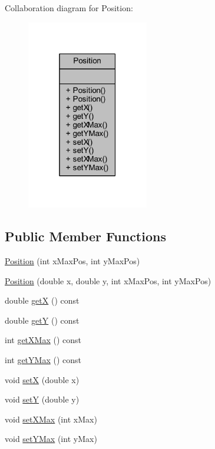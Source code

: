 Collaboration diagram for Position\+:
\nopagebreak
\begin{figure}[H]
\begin{center}
\leavevmode
\includegraphics[width=151pt]{class_position__coll__graph}
\end{center}
\end{figure}
\subsection*{Public Member Functions}
\begin{DoxyCompactItemize}
\item 
\mbox{\hyperlink{class_position_a64f68cd96fa0eedccbb760143b82442a}{Position}} (int x\+Max\+Pos, int y\+Max\+Pos)
\item 
\mbox{\hyperlink{class_position_ace954f29b47b5324517ea8ed2487c949}{Position}} (double x, double y, int x\+Max\+Pos, int y\+Max\+Pos)
\item 
double \mbox{\hyperlink{class_position_a10a2a09ec64310f42138f98238ec5fbd}{getX}} () const
\item 
double \mbox{\hyperlink{class_position_a83ae4a9db1a4f29e5a43e5592b65f095}{getY}} () const
\item 
int \mbox{\hyperlink{class_position_abc0b7856e25fab037f1dbfb543ec96cf}{get\+X\+Max}} () const
\item 
int \mbox{\hyperlink{class_position_a6796150fb51e6d8760a5d025b09d1ca5}{get\+Y\+Max}} () const
\item 
void \mbox{\hyperlink{class_position_af12bdfae6a9ccecfc31d968de3613a1d}{setX}} (double x)
\item 
void \mbox{\hyperlink{class_position_a5fbae78d4986da56edad357a82e1e376}{setY}} (double y)
\item 
void \mbox{\hyperlink{class_position_acb2c50493422d1a6faceb3ed7e2a8caf}{set\+X\+Max}} (int x\+Max)
\item 
void \mbox{\hyperlink{class_position_a715321d96c4195ddb3381b52a6cf547c}{set\+Y\+Max}} (int y\+Max)
\end{DoxyCompactItemize}


